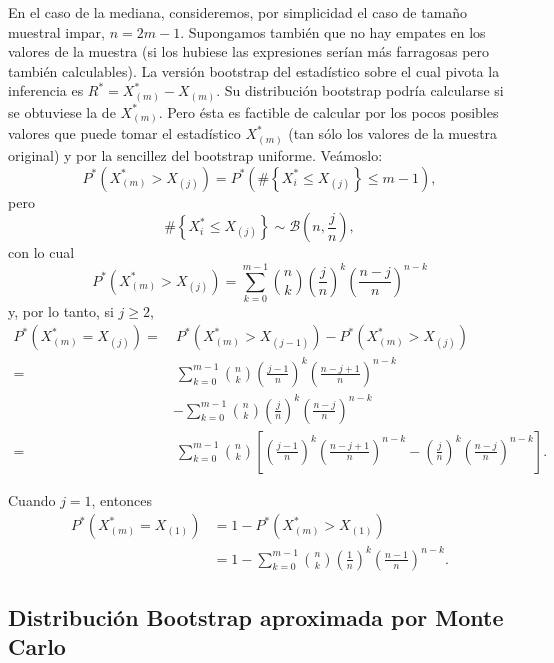 \documentclass[
]{book}
\theoremstyle{break}
\theoremstyle{nonumberplain}
\begin{document}
En el caso de la mediana, consideremos, por simplicidad el caso de
tamaño muestral impar, \(n=2m-1\). Supongamos también que no hay empates
en los valores de la muestra (si los hubiese las expresiones serían más
farragosas pero también calculables). La versión bootstrap del
estadístico sobre el cual pivota la inferencia es \(R^{\ast}=X_{\left(
m \right)}^{\ast}-X_{(m)}\). Su distribución bootstrap
podría calcularse si se obtuviese la de \(X_{(m)}^{\ast}\).
Pero ésta es factible de calcular por los pocos posibles valores que
puede tomar el estadístico \(X_{(m)}^{\ast}\) (tan sólo los
valores de la muestra original) y por la sencillez del bootstrap
uniforme.
Veámoslo:
\[P^{\ast}\left( X_{(m)}^{\ast}>X_{(j)} \right)
=P^{\ast}\left( \#\left\{ X_i^{\ast}\leq X_{(j)}\right\}
\leq m-1 \right),\]
pero
\[\#\left\{ X_i^{\ast}\leq X_{(j)}\right\} \sim \mathcal{B}\left(
n,\frac{j}{n} \right),\]
con lo cual
\[P^{\ast}\left( X_{(m)}^{\ast}>X_{(j)} \right)
=\sum_{k=0}^{m-1}\binom{n}{k}\left( \frac{j}{n} \right)^{k}
\left( \frac{n-j}{n} \right)^{n-k}\]
y, por lo tanto, si \(j\geq 2\),
\[\begin{aligned}
P^{\ast}\left( X_{(m)}^{\ast}=X_{(j)} \right)
=&\ P^{\ast}\left( X_{(m)}^{\ast}>X_{\left( j-1 \right)} \right)
-P^{\ast}\left( X_{(m)}^{\ast}>X_{(j)} \right) \\
=&\ \sum_{k=0}^{m-1}\binom{n}{k}\left( \frac{j-1}{n} \right)^{k}\left( \frac{
n-j+1}{n} \right)^{n-k} \\
&-\sum_{k=0}^{m-1}\binom{n}{k}\left( \frac{j}{n} \right)^{k}\left( \frac{n-j}{
n} \right)^{n-k} \\
=&\ \sum_{k=0}^{m-1}\binom{n}{k}\left[ \left( \frac{j-1}{n} \right)^{k}\left( 
\frac{n-j+1}{n} \right)^{n-k}-\left( \frac{j}{n} \right)^{k}\left( \frac{n-j
}{n} \right)^{n-k}\right] .
\end{aligned}\]

Cuando \(j=1\), entonces
\[\begin{aligned}
P^{\ast}\left( X_{(m)}^{\ast} = X_{(1)} \right)
&= 1-P^{\ast}\left( X_{(m)}^{\ast}>X_{(1)} \right) \\
&=  1-\sum_{k=0}^{m-1}\binom{n}{k}\left( \frac{1}{n} \right)^{k}
\left( \frac{n-1}{n} \right)^{n-k}.
\end{aligned}\]

\subsection{Distribución Bootstrap aproximada por Monte Carlo}\label{distribuciuxf3n-bootstrap-aproximada-por-monte-carlo}
\end{document}
